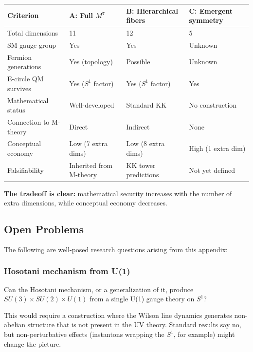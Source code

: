 \documentclass[aps,prd,preprint,superscriptaddress,longbibliography,floatfix]{revtex4-2}
\theoremstyle{remark}
\begin{document}
\begin{table}[H]
\begin{ruledtabular}
\begin{tabular}{p{3.8cm}p{3.8cm}p{3.8cm}p{3.8cm}}
Criterion & A: Full $M^7$ & B: Hierarchical fibers & C: Emergent symmetry \\
\hline
Total dimensions & 11 & 12 & 5 \\
SM gauge group & Yes & Yes & Unknown \\
Fermion generations & Yes (topology) & Possible & Unknown \\
E-circle QM survives & Yes ($S^1$ factor) & Yes ($S^1$ factor) & Yes \\
Mathematical status & Well-developed & Standard KK & No construction \\
Connection to M-theory & Direct & Indirect & None \\
Conceptual economy & Low (7 extra dims) & Low (8 extra dims) & High (1 extra dim) \\
Falsifiability & Inherited from M-theory & KK tower predictions & Not yet defined \\
\end{tabular}
\end{ruledtabular}
\end{table}

\textbf{The tradeoff is clear:} mathematical security increases with the number of extra dimensions, while conceptual economy decreases.



\subsection{Open Problems}

The following are well-posed research questions arising from this appendix:


\subsubsection{Hosotani mechanism from U(1)}

Can the Hosotani mechanism, or a generalization of it, produce $SU(3) \times SU(2) \times U(1)$ from a single U(1) gauge theory on $S^1$?

This would require a construction where the Wilson line dynamics generates non-abelian structure that is not present in the UV theory. Standard results say no, but non-perturbative effects (instantons wrapping the $S^1$, for example) might change the picture.
\end{document}

